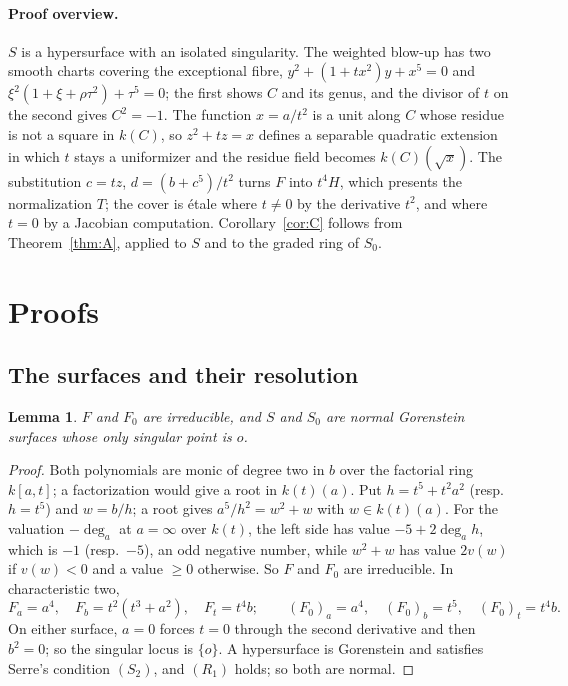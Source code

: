 \documentclass[11pt,a4paper]{article}
\newtheorem{lemma}{Lemma}[section]
\theoremstyle{definition}
\begin{document}
\paragraph{Proof overview.} $S$ is a hypersurface with an isolated
singularity. The weighted blow-up has two smooth charts covering the
exceptional fibre, $y^2+(1+tx^2)y+x^5=0$ and
$\xi^2(1+\xi+\rho\tau^2)+\tau^5=0$; the first shows $C$ and its genus, and
the divisor of $t$ on the second gives $C^2=-1$. The function $x=a/t^2$ is a
unit along $C$ whose residue is not a square in $k(C)$, so $z^2+tz=x$ defines
a separable quadratic extension in which $t$ stays a uniformizer and the
residue field becomes $k(C)(\sqrt{x})$. The substitution $c=tz$,
$d=(b+c^5)/t^2$ turns $F$ into $t^4H$, which presents the normalization $T$;
the cover is \'etale where $t\ne0$ by the derivative $t^2$, and where $t=0$
by a Jacobian computation. Corollary~\ref{cor:C} follows from
Theorem~\ref{thm:A}, applied to $S$ and to the graded ring of $S_0$.

\section{Proofs}\label{sec:proofs}

\subsection{The surfaces and their resolution}

\begin{lemma}\label{lem:normal}
$F$ and $F_0$ are irreducible, and $S$ and $S_0$ are normal Gorenstein
surfaces whose only singular point is $o$.
\end{lemma}

\begin{proof}
Both polynomials are monic of degree two in $b$ over the factorial ring
$k[a,t]$; a factorization would give a root in $k(t)(a)$. Put
$h=t^5+t^2a^2$ (resp.\ $h=t^5$) and $w=b/h$; a root gives
$a^5/h^2=w^2+w$ with $w\in k(t)(a)$. For the valuation $-\deg_a$ at $a=\infty$
over $k(t)$, the left side has value $-5+2\deg_a h$, which is $-1$
(resp.\ $-5$), an odd negative number, while $w^2+w$ has value $2v(w)$ if
$v(w)<0$ and a value $\ge0$ otherwise. So $F$ and $F_0$ are irreducible. In
characteristic two,
\[
F_a=a^4,\quad F_b=t^2(t^3+a^2),\quad F_t=t^4b;\qquad
(F_0)_a=a^4,\quad (F_0)_b=t^5,\quad (F_0)_t=t^4b.
\]
On either surface, $a=0$ forces $t=0$ through the second derivative and then
$b^2=0$; so the singular locus is $\{o\}$. A hypersurface is Gorenstein and
satisfies Serre's condition $(S_2)$, and $(R_1)$ holds; so both are normal.
\end{proof}
\end{document}
